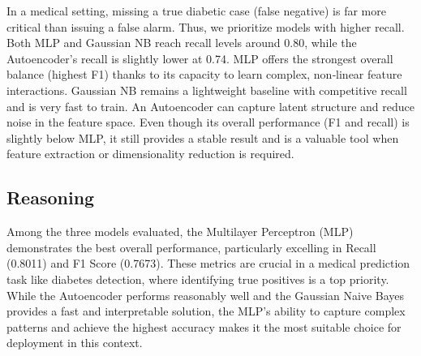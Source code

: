 In a medical setting, missing a true diabetic case (false negative) is far more critical than issuing a false alarm. Thus, we prioritize models with higher recall. Both MLP and Gaussian NB reach recall levels around 0.80, while the Autoencoder's recall is slightly lower at 0.74.
MLP offers the strongest overall balance (highest F1) thanks to its capacity to learn complex, non‐linear feature interactions. Gaussian NB remains a lightweight baseline with competitive recall and is very fast to train.
An Autoencoder can capture latent structure and reduce noise in the feature space. Even though its overall performance (F1 and recall) is slightly below MLP, it still provides a stable result and is a valuable tool when feature extraction or dimensionality reduction is required.


\subsection{Reasoning}
Among the three models evaluated, the Multilayer Perceptron (MLP) demonstrates the best overall performance, particularly excelling in Recall (0.8011) and F1 Score (0.7673). These metrics are crucial in a medical prediction task like diabetes detection, where identifying true positives is a top priority. While the Autoencoder performs reasonably well and the Gaussian Naive Bayes provides a fast and interpretable solution, the MLP's ability to capture complex patterns and achieve the highest accuracy makes it the most suitable choice for deployment in this context.